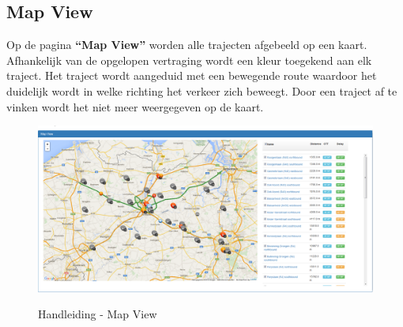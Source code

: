 \subsection{Map View}

Op de pagina \textbf{“Map View”} worden alle trajecten afgebeeld op een kaart. Afhankelijk van de opgelopen vertraging wordt een kleur toegekend aan elk traject. Het traject wordt aangeduid met een bewegende route waardoor het duidelijk wordt in welke richting het verkeer zich beweegt. Door een traject af te vinken wordt het niet meer weergegeven op de kaart.

\begin{figure}[H]
\centering
\includegraphics[width=\textwidth]{images/mapView.png}\\
\caption{Handleiding - Map View}
\end{figure}